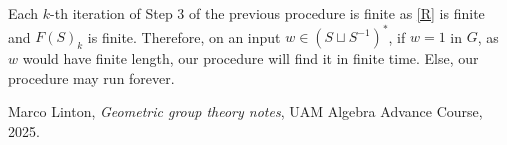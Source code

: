 \documentclass[11pt,a4paper]{article}
\begin{document}
Each $k$-th iteration of Step 3 of the previous procedure is finite as \eqref{R} is finite and $ F(S)_k $ is finite. Therefore, on an input $ w \in (S \sqcup S^{-1})^* $, if $ w = 1 $ in $ G $, as $ w $ would have finite length, our procedure will find it in finite time. Else, our procedure may run forever.

\begin{thebibliography}{9}

  Marco Linton,
  \textit{Geometric group theory notes},
  UAM Algebra Advance Course, 2025.
  
\end{thebibliography}
\end{document}
